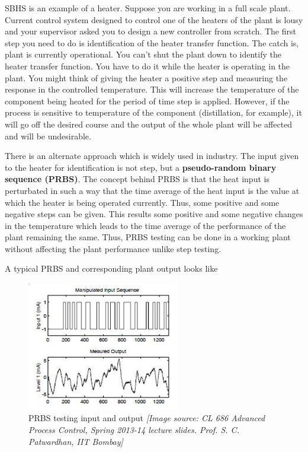 SBHS is an example of a heater. Suppose you are working in a full scale plant. Current control system designed to control one of the heaters of the plant is lousy and your supervisor asked you to design a new controller from scratch. The first step you need to do is identification of the heater transfer function. The catch is, plant is currently
operational. You can't shut the plant down to identify the heater transfer function. You have to do it while the heater is operating in the plant. You might think of giving the heater a positive step and measuring the response in the controlled temperature. This will
increase the temperature of the component being heated for the period of time step is applied. However, if the process is sensitive to temperature of the component (distillation, for example), it will go off the desired course and the output of the whole plant will be affected and will be undesirable.

\vspace{12pt}

There is an alternate approach which is widely used in industry. The input given to the heater for identification is not step, but a \textbf{pseudo-random binary sequence (PRBS)}. The concept behind PRBS is that the heat input is perturbated in such a way that the time average of the heat input is the value at which the heater is being operated currently. Thus, some positive and some negative steps can be given. This results some positive and some negative changes in the temperature which leads to the time average of the performance of the plant remaining the same. Thus, PRBS testing can be done in a working plant without affecting the plant performance unlike step testing.

\vspace{12pt}

A typical PRBS and corresponding plant output looks like

\begin{figure}[H]
\begin{centering}
\includegraphics[width=0.6\textwidth]{prbs/PRBS}
\par\end{centering}

\caption{PRBS testing input and output \textit{{[}Image source: CL 686 Advanced
Process Control, Spring 2013-14 lecture slides. Prof. S. C. Patwardhan, IIT Bombay{]}}}
\end{figure}


